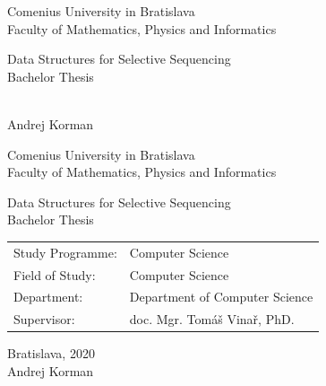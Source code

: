 \documentclass[12pt, twoside]{book}
\def\mfrok{2020}
\def\mfnazov{Data Structures for Selective Sequencing}
\def\mftyp{Bachelor Thesis}
\def\mfautor{Andrej Korman}
\def\mfskolitel{doc. Mgr. Tomáš Vinař, PhD.}
\def\mfmiesto{Bratislava, \mfrok}
\def\mfodbor{Computer Science}
\def\program{Computer Science }
\def\mfpracovisko{ Department of Computer Science }
\begin{document}
     
\frontmatter


\thispagestyle{empty}

\begin{center}
  \sc\large
  Comenius University in Bratislava\\
  Faculty of Mathematics, Physics and Informatics

\vfill

{\LARGE\mfnazov}\\
\mftyp
\end{center}

\vfill

{\sc\large 
\noindent \mfrok\\
\mfautor
}

\cleardoublepage


\thispagestyle{empty}
\noindent

\begin{center}
\sc  
\large
  Comenius University in Bratislava\\
  Faculty of Mathematics, Physics and Informatics

\vfill

{\LARGE\mfnazov}\\
\mftyp
\end{center}

\vfill

\noindent
\begin{tabular}{ll}
Study Programme: & \program \\
Field of Study: & \mfodbor \\
Department: & \mfpracovisko \\
Supervisor: & \mfskolitel \\
\end{tabular}

\vfill


\noindent \mfmiesto\\
\mfautor

\cleardoublepage


\end{document}
